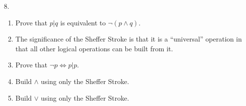 \documentclass[10pt,]{book}
\theoremstyle{plain}
\theoremstyle{definition}
\theoremstyle{definition}
\theoremstyle{definition}
\theoremstyle{definition}
\begin{document}
\begin{exercisegroup}
\item[8.]\hypertarget{exercise-19}{}\leavevmode%
\begin{enumerate}[label=\alph*]
\item\hypertarget{li-98}{}Prove that \(p | q\) is equivalent to \(\neg (p \land  q)\).%
\item\hypertarget{li-99}{}The significance of the Sheffer Stroke is that it is a ``universal'' operation in that all other logical operations can be built from it.%
\item\hypertarget{li-100}{}Prove that \(\neg p \Leftrightarrow  p | p\).%
\item\hypertarget{li-101}{}Build \(\land\) using only the Sheffer Stroke.%
\item\hypertarget{li-102}{}Build \(\lor\) using only the Sheffer Stroke.%
\end{enumerate}
%
\par\smallskip
\end{exercisegroup}
\par\smallskip\noindent
\typeout{************************************************}
\typeout{************************************************}
\end{document}
